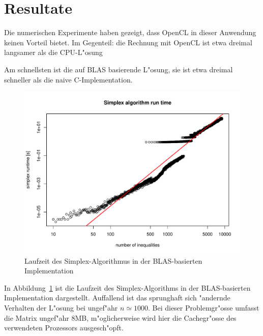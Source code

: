\section{Resultate}
Die numerischen Experimente haben gezeigt, dass OpenCL in dieser Anwendung
keinen Vorteil bietet. Im Gegenteil: die Rechnung mit OpenCL ist
etwa dreimal langsamer als die CPU-L"osung

Am schnellsten ist die auf BLAS basierende L"osung, sie ist etwa dreimal
schneller als die naive C-Implementation.

\begin{figure}
\begin{center}
\includegraphics[width=\hsize]{add/runtime.pdf}
\end{center}
\caption{Laufzeit des Simplex-Algorithmus in der BLAS-basierten
Implementation\label{simplex:runtime}}
\end{figure}
In Abbildung~\ref{simplex:runtime} ist  die Laufzeit des Simplex-Algorithms
in der BLAS-basierten Implementation dargestellt.  Auffallend
ist das sprunghaft sich "andernde Verhalten der L"osung bei ungef"ahr
$n\simeq 1000$. Bei dieser Problemgr"osse umfasst die Matrix
ungef"ahr 8MB, m"oglicherweise wird hier die Cachegr"osse des
verwendeten Prozessors ausgesch"opft.

